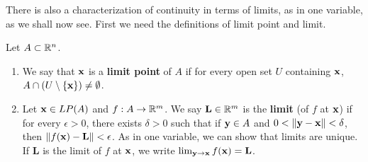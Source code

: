 \documentclass[../main.tex]{subfiles}
\begin{document}
\begin{remark}\label{rmk:18.28}
    There is also a characterization of continuity in terms of limits, as in one variable, as we shall now see. First we need the definitions of limit point and limit.
\end{remark}

\begin{definition}\label{dfn:18.29}
    Let $A\subset\mathbb{R}^n$.
    \begin{enumerate}[label={(\alph*)}]
        \item We say that $\mathbf{x}$ is a \textbf{limit point} of $A$ if for every open set $U$ containing $\mathbf{x}$, $A\cap(U\setminus\{\mathbf{x}\})\neq\emptyset$.
        \item Let $\mathbf{x}\in LP(A)$ and $f:A\to\mathbb{R}^m$. We say $\mathbf{L}\in\mathbb{R}^m$ is the \textbf{limit} (of $f$ at $\mathbf{x}$) if for every $\epsilon>0$, there exists $\delta>0$ such that if $\mathbf{y}\in A$ and $0<\norm{\mathbf{y}-\mathbf{x}}<\delta$, then $\norm{f(\mathbf{x})-\mathbf{L}}<\epsilon$. As in one variable, we can show that limits are unique. If $\mathbf{L}$ is the limit of $f$ at $\mathbf{x}$, we write $\lim_{\mathbf{y}\to\mathbf{x}}f(\mathbf{x})=\mathbf{L}$.
    \end{enumerate}
\end{definition}
\end{document}
